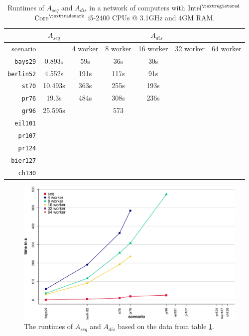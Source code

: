 \begin{table}[h!]
  \centering
  \begin{tabular}{r|c||c|c|c|c|c|}
    \cline{2-7}
    & \multicolumn{1}{c||}{$A_{seq}$} & \multicolumn{5}{c|}{$A_{dis}$} \\
    \hline
    \multicolumn{1}{|r||}{scenario} & & 4 worker & 8 worker & 16 worker & 32 worker & 64 worker \\
    \hline
    \hline
    \multicolumn{1}{|r||}{\texttt{bays29}} & 0.893s & 59s & 36s & 30s & & \\
    \hline
    \multicolumn{1}{|r||}{\texttt{berlin52}} & 4.552s & 191s & 117s & 91s & & \\
    \hline
    \multicolumn{1}{|r||}{\texttt{st70}} & 10.493s & 363s & 255s & 193s & & \\
    \hline
    \multicolumn{1}{|r||}{\texttt{pr76}} & 19.3s & 484s & 308s & 236s & & \\
    \hline
    \multicolumn{1}{|r||}{\texttt{gr96}} & 25.595s & & 573 & & & \\
    \hline
    \multicolumn{1}{|r||}{\texttt{eil101}} & & & & & & \\
    \hline
    \multicolumn{1}{|r||}{\texttt{pr107}} & & & & & & \\
    \hline
    \multicolumn{1}{|r||}{\texttt{pr124}} & & & & & & \\
    \hline
    \multicolumn{1}{|r||}{\texttt{bier127}} & & & & & & \\
    \hline
    \multicolumn{1}{|r||}{\texttt{ch130}} & & & & & & \\
    \hline
  \end{tabular}
  \caption{Runtimes of $A_{seq}$ and $A_{dis}$ in a network of computers with $\text{Intel}^{\textregistered}$ $\text{Core}^{\texttrademark}$ i5-2400 CPUs @ 3.1GHz and 4GM RAM.}
  \vspace*{-0.75em}
  \label{tbl:test2}
\end{table}

\begin{figure}[h!]
  \centering
  \includegraphics[width=\textwidth]{img/test_distributed.pdf}
  \caption{The runtimes of $A_{seq}$ and $A_{dis}$ based on the data from table \ref{tbl:test2}.}
  \label{fig:test2}
\end{figure}

